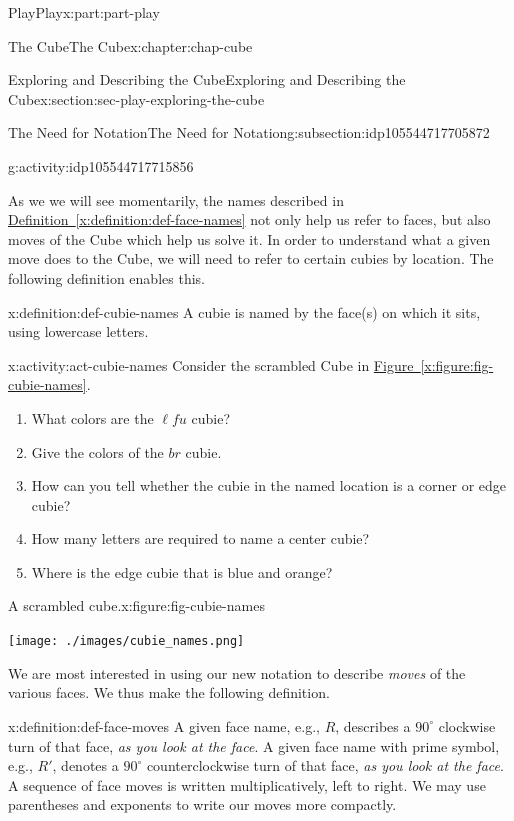 \documentclass[oneside,10pt,]{book}
\newcommand{\xreffont}{\relax}
\numberwithin{equation}{section}
\begin{document}
\begin{partptx}{Play}{}{Play}{}{}{x:part:part-play}
\begin{chapterptx}{The Cube}{}{The Cube}{}{}{x:chapter:chap-cube}
\begin{sectionptx}{Exploring and Describing the Cube}{}{Exploring and Describing the Cube}{}{}{x:section:sec-play-exploring-the-cube}
\begin{subsectionptx}{The Need for Notation}{}{The Need for Notation}{}{}{g:subsection:idp105544717705872}
\begin{activity}{}{g:activity:idp105544717715856}
\end{activity}%
As we we will see momentarily, the names described in \hyperref[x:definition:def-face-names]{Definition~{\xreffont\ref{x:definition:def-face-names}}} not only help us refer to faces, but also moves of the Cube which help us solve it. In order to understand what a given move does to the Cube, we will need to refer to certain cubies by location. The following definition enables this.%
\begin{definition}{}{x:definition:def-cubie-names}%
A cubie is named by the face(s) on which it sits, using lowercase letters.%
\end{definition}
\begin{activity}{}{x:activity:act-cubie-names}%
Consider the scrambled Cube in \hyperref[x:figure:fig-cubie-names]{Figure~{\xreffont\ref{x:figure:fig-cubie-names}}}.%
%
\begin{enumerate}
\item{}What colors are the \(\ell f u\) cubie?%
\item{}Give the colors of the \(br\) cubie.%
\item{}How can you tell whether the cubie in the named location is a corner or edge cubie?%
\item{}How many letters are required to name a center cubie?%
\item{}Where is the edge cubie that is blue and orange?%
\end{enumerate}
\begin{figureptx}{A scrambled cube.}{x:figure:fig-cubie-names}{}%
\begin{image}{0.25}{0.5}{0.25}%
\texttt{[image: ./images/cubie\_names.png]}
\end{image}%
\tcblower
\end{figureptx}%
\end{activity}%
We are most interested in using our new notation to describe \emph{moves} of the various faces. We thus make the following definition.%
\begin{definition}{}{x:definition:def-face-moves}%
%
A given face name, e.g., \(R\), describes a \(90^\circ\) clockwise turn of that face, \emph{as you look at the face}. A given face name with prime symbol, e.g., \(R'\), denotes a \(90^\circ\) counterclockwise turn of that face, \emph{as you look at the face}. A sequence of face moves is written multiplicatively, left to right. We may use parentheses and exponents to write our moves more compactly.%
\end{definition}

\end{subsectionptx}
\end{sectionptx}
\end{chapterptx}
\end{partptx}
\end{document}
